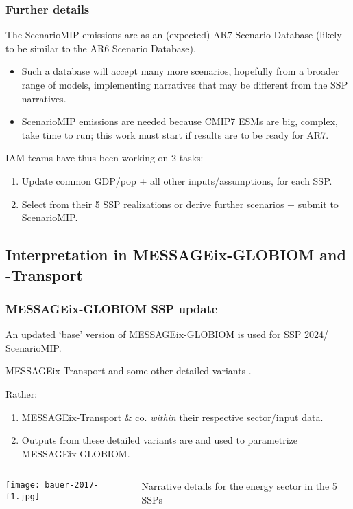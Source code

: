 \documentclass[12pt,aspectratio=169]{beamer}
\begin{document}
\begin{frame}
\frametitle{Further details}

The ScenarioMIP emissions are  as an (expected) AR7 Scenario Database (likely to be similar to the AR6 Scenario Database).
\begin{itemize}
  \item Such a database will accept many more scenarios, hopefully from a broader range of models, implementing narratives that may be different from the SSP narratives.
  \item ScenarioMIP emissions are needed because CMIP7 ESMs are big, complex, take time to run; this work must start if results are to be ready for AR7.
\end{itemize}

\bigskip
IAM teams have thus been working on 2 tasks:
\begin{enumerate}
  \item Update common GDP/pop + all other inputs/assumptions, for each SSP.
  \item Select from their 5 SSP realizations or derive further scenarios + submit to ScenarioMIP.
\end{enumerate}
\end{frame}

\subsection{Interpretation in MESSAGEix-GLOBIOM and -Transport}

\begin{frame}
\frametitle{MESSAGEix-GLOBIOM SSP update}

An updated ‘base’ version of MESSAGEix-GLOBIOM is used for SSP 2024/ ScenarioMIP.

\medskip
MESSAGEix-Transport and some other detailed variants .

\bigskip
Rather:
\begin{enumerate}
  \item MESSAGEix-Transport \& co.  \emph{within} their respective sector/input data.
  \item Outputs from these detailed variants are  and used to parametrize MESSAGEix-GLOBIOM.
\end{enumerate}

\end{frame}

\begin{frame}[plain]

\vspace*{2mm}
\begin{columns}
\column[T]{0.75\paperwidth}
\texttt{[image: bauer-2017-f1.jpg]}

\column[T]{0.25\paperwidth}
\bigskip
Narrative details for the energy sector in the 5 SSPs \parencite[][fig. 1]{bauer-2017}

\end{columns}
\end{frame}
\end{document}
